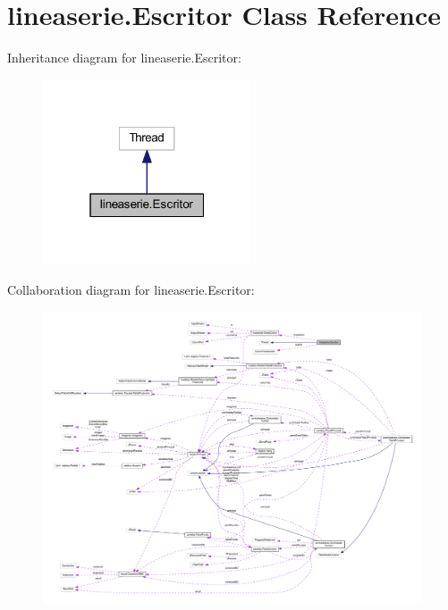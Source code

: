 \hypertarget{classlineaserie_1_1_escritor}{}\section{lineaserie.\+Escritor Class Reference}
\label{classlineaserie_1_1_escritor}


Inheritance diagram for lineaserie.\+Escritor\+:\nopagebreak
\begin{figure}[H]
\begin{center}
\leavevmode
\includegraphics[width=175pt]{classlineaserie_1_1_escritor__inherit__graph}
\end{center}
\end{figure}


Collaboration diagram for lineaserie.\+Escritor\+:\nopagebreak
\begin{figure}[H]
\begin{center}
\leavevmode
\includegraphics[width=350pt]{classlineaserie_1_1_escritor__coll__graph}
\end{center}
\end{figure}
